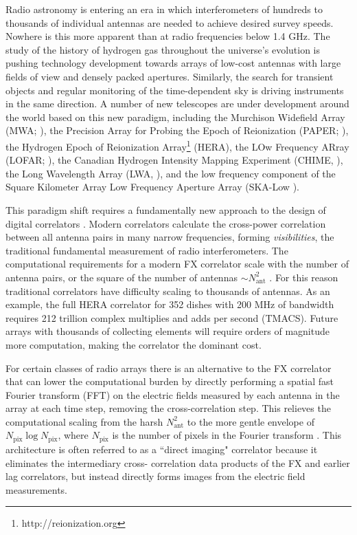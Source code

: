 \documentclass[a4paper,fleqn,usenatbib]{../mnras}
\newcommand{\Nant}{N_{\text{ant}}}
\newcommand{\Npix}{N_{\text{pix}}}
\begin{document}
Radio astronomy is entering an era in which interferometers of hundreds to
thousands of individual antennas are needed to achieve desired survey speeds.
Nowhere is this more apparent than at radio frequencies below 1.4 GHz. The study
of the history of hydrogen gas throughout the universe's evolution is pushing
technology development towards arrays of low-cost antennas with large fields of
view and densely packed apertures. Similarly, the search for transient objects
and regular monitoring of the time-dependent sky is driving instruments in the
same direction. A number of new telescopes are under development around the world
based on this new paradigm, including the Murchison Widefield Array (MWA;
\citealt{tin13,bow13}), the Precision Array for Probing the Epoch of Reionization
(PAPER; \citealt{par10}), the Hydrogen Epoch of Reionization 
Array\footnote{http://reionization.org} (HERA), the LOw Frequency ARray (LOFAR;
\citealt{van13}), the Canadian Hydrogen Intensity Mapping Experiment (CHIME,
\citealt{ban14}), the Long Wavelength Array (LWA, \citealt{ell13}), and the low
frequency component of the Square Kilometer Array Low Frequency Aperture Array
(SKA-Low \citealt{mel13}).

This paradigm shift requires a fundamentally new approach to the design of
digital correlators \citep{lon00}. Modern correlators calculate the cross-power
correlation between all antenna pairs in many narrow frequencies, forming
\emph{visibilities}, the traditional fundamental measurement of radio
interferometers. The computational requirements for a modern FX correlator scale
with the number of antenna pairs, or the square of the number of antennas $\sim
\Nant^2$ \citep{bun04}. For this reason traditional correlators have difficulty
scaling to thousands of antennas. As an example, the full HERA correlator for
352 dishes with 200 MHz of bandwidth requires 212 trillion complex multiplies
and adds per second (TMACS). Future arrays with thousands of collecting elements
will require orders of magnitude more computation, making the correlator the
dominant cost.

For certain classes of radio arrays there is an alternative to the FX correlator
that can lower the computational burden by directly performing a spatial fast
Fourier transform (FFT) on the electric fields measured by each antenna in the
array at each time step, removing the cross-correlation step. This relieves the
computational scaling from the harsh $\Nant^2$ to the more gentle envelope of
$\Npix\log\Npix$, where $\Npix$ is the number of pixels in the Fourier transform
\citep[e.g.][]{mor11,teg09,teg10}. This architecture is often referred to as a
``direct imaging" correlator because it eliminates the intermediary cross-
correlation data products of the FX and earlier lag correlators, but instead
directly forms images from the electric field measurements.
\end{document}
